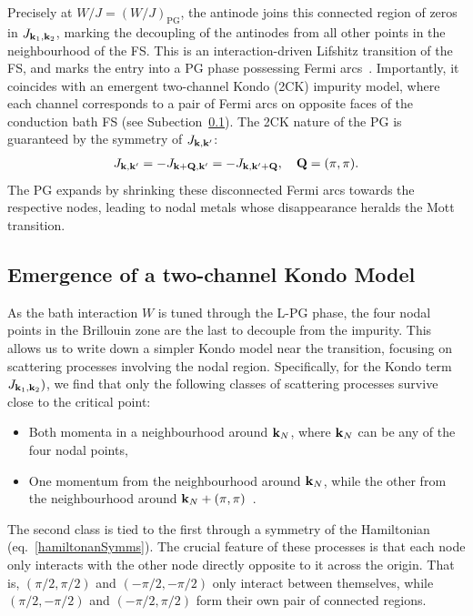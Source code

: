 Precisely at $W/J=(W/J)_{\text{PG}}$, the antinode joins this connected region of zeros in $J_{{\bf k}_1, {\bf k}_2}$, marking the decoupling of the antinodes from all other points in the neighbourhood of the FS. This is an interaction-driven Lifshitz transition of the FS, and marks the entry into a PG phase possessing Fermi arcs~\cite{WuFerrero2018}. Importantly, it coincides with an emergent two-channel Kondo (2CK) impurity model, where each channel corresponds to a pair of Fermi arcs on opposite faces of the conduction bath FS (see Subection~\ref{2CKEmerge}). The 2CK nature of the PG is guaranteed by the symmetry of $J_{{\bf k},{\bf k'}}$: 
\begin{equation}
	\begin{aligned}\label{hamiltonanSymms}
J_{{\bf k},{\bf k'}}= -J_{{\bf k}+{\bf Q},{\bf k'}}=-J_{{\bf k},{\bf k'}+{\bf Q}}, \quad {\bf Q} = (\pi,\pi).
\end{aligned}
\end{equation}
The PG expands by shrinking these disconnected Fermi arcs towards the respective nodes, leading to nodal metals whose disappearance heralds the Mott transition. 

\subsection{Emergence of a two-channel Kondo Model}\label{2CKEmerge}
As the bath interaction \(W\) is tuned through the L-PG phase, the four nodal points in the Brillouin zone are the last to decouple from the impurity. This allows us to write down a simpler Kondo model near the transition, focusing on scattering processes involving the nodal region. Specifically, for the Kondo term \(J_{{\bf k}_1, {\bf k}_2})\), we find that only the following classes of scattering processes survive close to the critical point:
\begin{itemize}
	\item Both momenta in a neighbourhood around \({\bf k}_N\), where \({\bf k}_N\) can be any of the four nodal points,
	\item One momentum from the neighbourhood around \({\bf k}_N\), while the other from the neighbourhood around \({\bf k}_N + \left( \pi, \pi \right) \)~.
\end{itemize}
The second class is tied to the first through a symmetry of the Hamiltonian (eq.~\ref{hamiltonanSymms}). The crucial feature of these processes is that each node only interacts with the other node directly opposite to it across the origin. That is, \(\left(\pi/2, \pi/2\right) \) and \(\left(-\pi/2, -\pi/2\right) \) only interact between themselves, while \(\left(\pi/2, -\pi/2\right) \) and \(\left(-\pi/2, \pi/2\right) \) form their own pair of connected regions. 

